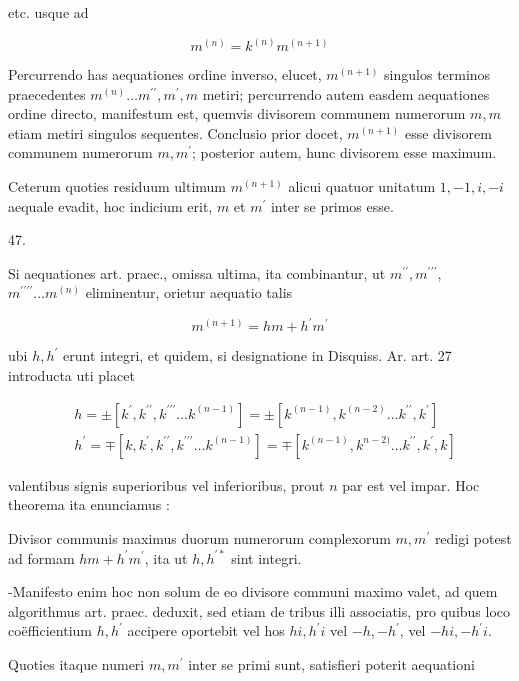 \documentclass[10pt]{article}
\begin{document}
etc. usque ad

\[
m^{(n)}=k^{(n)} m^{(n+1)}
\]

Percurrendo has aequationes ordine inverso, elucet, \(m^{(n+1)}\) singulos terminos praecedentes \(m^{(n)} \ldots m^{\prime \prime}, m^{\prime}, m\) metiri; percurrendo autem easdem aequationes ordine directo, manifestum est, quemvis divisorem communem numerorum \(m, m\) etiam metiri singulos sequentes. Conclusio prior docet, \(m^{(n+1)}\) esse divisorem communem numerorum \(m, m^{\prime}\); posterior autem, hunc divisorem esse maximum.

Ceterum quoties residuum ultimum \(m^{(n+1)}\) alicui quatuor unitatum \(1,-1, i,-i\) aequale evadit, hoc indicium erit, \(m\) et \(m^{\prime}\) inter se primos esse.

47.

\(\mathrm{Si}\) aequationes art. praec., omissa ultima, ita combinantur, ut \(m^{\prime \prime}, m^{\prime \prime \prime}\), \(m^{\prime \prime \prime \prime} \ldots m^{(n)}\) eliminentur, orietur aequatio talis

\[
m^{(n+1)}=h m+h^{\prime} m^{\prime}
\]

ubi \(h, h^{\prime}\) erunt integri, et quidem, si designatione in Disquiss. Ar. art. 27 introducta uti placet

\[
\begin{aligned}
& h= \pm\left[k^{\prime}, k^{\prime \prime}, k^{\prime \prime \prime} \ldots k^{(n-1)}\right]= \pm\left[k^{(n-1)}, k^{(n-2)} \ldots k^{\prime \prime}, k^{\prime}\right] \\
& h^{\prime}=\mp\left[k, k^{\prime}, k^{\prime \prime}, k^{\prime \prime \prime} \ldots k^{(n-1)}\right]=\mp\left[k^{(n-1)}, k^{n-2)} \ldots k^{\prime \prime}, k^{\prime}, k\right]
\end{aligned}
\]

valentibus signis superioribus vel inferioribus, prout \(n\) par est vel impar. Hoc theorema ita enunciamus :

Divisor communis maximus duorum numerorum complexorum \(m, m^{\prime}\) redigi potest ad formam \(h m+h^{\prime} m^{\prime}\), ita ut \(h, h^{\prime *}\) sint integri.

-Manifesto enim hoc non solum de eo divisore communi maximo valet, ad quem algorithmus art. praec. deduxit, sed etiam de tribus illi associatis, pro quibus loco coëfficientium \(h, h^{\prime}\) accipere oportebit vel hos \(h i, h^{\prime} i\) vel \(-h,-h^{\prime}\), vel \(-h i,-h^{\prime} i\).

Quoties itaque numeri \(m, m^{\prime}\) inter se primi sunt, satisfieri poterit aequationi
\end{document}
